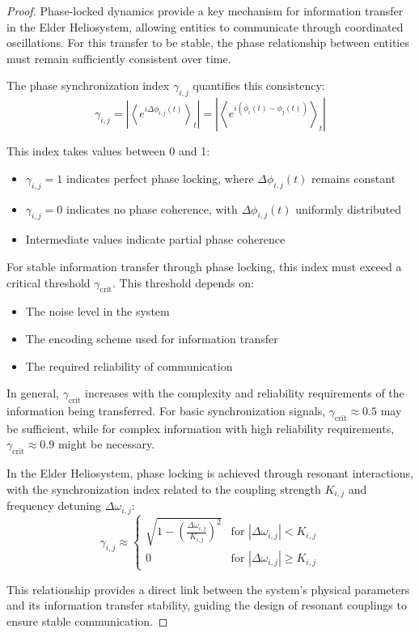 \begin{proof}
Phase-locked dynamics provide a key mechanism for information transfer in the Elder Heliosystem, allowing entities to communicate through coordinated oscillations. For this transfer to be stable, the phase relationship between entities must remain sufficiently consistent over time.

The phase synchronization index $\gamma_{i,j}$ quantifies this consistency:
\begin{equation}
\gamma_{i,j} = \left|\left\langle e^{i\Delta\phi_{i,j}(t)}\right\rangle_t\right| = \left|\left\langle e^{i(\phi_i(t) - \phi_j(t))}\right\rangle_t\right|
\end{equation}

This index takes values between 0 and 1:
\begin{itemize}
    \item $\gamma_{i,j} = 1$ indicates perfect phase locking, where $\Delta\phi_{i,j}(t)$ remains constant
    \item $\gamma_{i,j} = 0$ indicates no phase coherence, with $\Delta\phi_{i,j}(t)$ uniformly distributed
    \item Intermediate values indicate partial phase coherence
\end{itemize}

For stable information transfer through phase locking, this index must exceed a critical threshold $\gamma_{\text{crit}}$. This threshold depends on:
\begin{itemize}
    \item The noise level in the system
    \item The encoding scheme used for information transfer
    \item The required reliability of communication
\end{itemize}

In general, $\gamma_{\text{crit}}$ increases with the complexity and reliability requirements of the information being transferred. For basic synchronization signals, $\gamma_{\text{crit}} \approx 0.5$ may be sufficient, while for complex information with high reliability requirements, $\gamma_{\text{crit}} \approx 0.9$ might be necessary.

In the Elder Heliosystem, phase locking is achieved through resonant interactions, with the synchronization index related to the coupling strength $K_{i,j}$ and frequency detuning $\Delta\omega_{i,j}$:
\begin{equation}
\gamma_{i,j} \approx \begin{cases}
\sqrt{1 - \left(\frac{\Delta\omega_{i,j}}{K_{i,j}}\right)^2} & \text{for } |\Delta\omega_{i,j}| < K_{i,j} \\
0 & \text{for } |\Delta\omega_{i,j}| \geq K_{i,j}
\end{cases}
\end{equation}

This relationship provides a direct link between the system's physical parameters and its information transfer stability, guiding the design of resonant couplings to ensure stable communication.
\end{proof}

